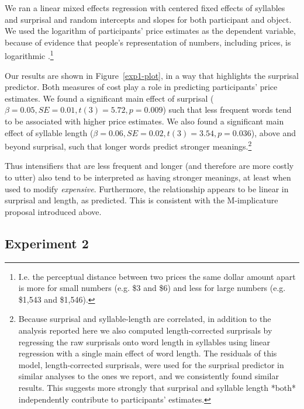 \documentclass[10pt,letterpaper]{article}
\begin{document}
We ran a linear mixed effects regression with centered fixed effects of syllables and surprisal and random intercepts and slopes for both participant and object.
We used the logarithm of participants' price estimates as the dependent variable, because of evidence that people's representation of numbers, including prices, is logarithmic \cite[e.g.]{dehaene}.\footnote{
  I.e. the perceptual distance between two prices the same dollar amount apart is more for small numbers (e.g. \$3 and \$6) and less for large numbers (e.g. \$1,543 and \$1,546).
}

Our results are shown in Figure~\ref{exp1-plot}, in a way that highlights the surprisal predictor. Both measures of cost play a role in predicting participants' price estimates. We found a significant main effect of surprisal ($\beta=0.05, SE=0.01, t(3)=5.72, p=0.009$) such that less frequent words tend to be associated with higher price estimates. We also found a significant main effect of syllable length ($\beta=0.06, SE=0.02, t(3)=3.54, p=0.036$), above and beyond surprisal, such that longer words predict stronger meanings.\footnote{
Because surprisal and syllable-length are correlated, in addition to the analysis reported here we also computed length-corrected surprisals by regressing the raw surprisals onto word length in syllables using linear regression with a single main effect of word length. The residuals of this model, length-corrected surprisals, were used for the surprisal predictor in similar analyses to the ones we report, and we consistently found similar results. This suggests more strongly that surprisal and syllable length *both* independently contribute to participants' estimates.
}

Thus intensifiers that are less frequent and longer (and therefore are more costly to utter) also tend to be interpreted as having stronger meanings, at least when used to modify \emph{expensive}. Furthermore, the relationship appears to be linear in surprisal and length, as predicted.
This is consistent with the M-implicature proposal introduced above.

\subsection{Experiment 2}
\end{document}
